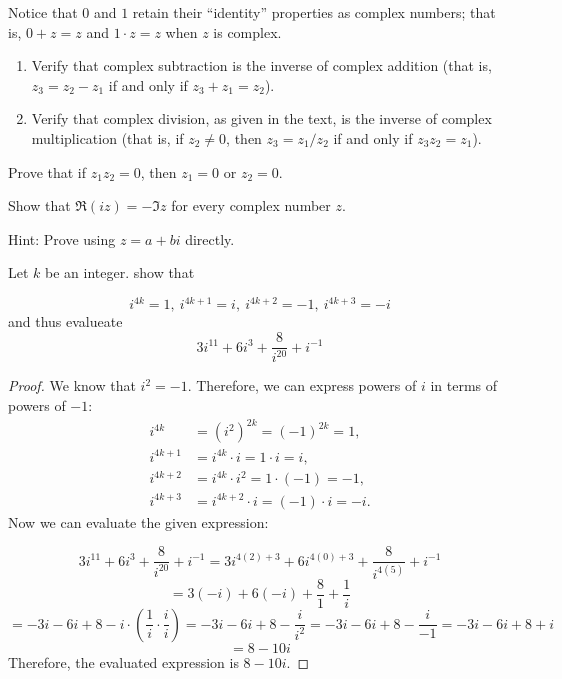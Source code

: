 \documentclass[
	12pt, %
	fleqn, %
	a4paper, %
]{LegrandOrangeBook}
\begin{document}
\begin{exercise}
    Notice that \(0\) and \(1\) retain their “identity” properties as complex numbers; that is, \(0 + z = z\) and \(1 \cdot z = z\) when \(z\) is complex.
    \begin{enumerate}[label=(\alph*)]
        \item Verify that complex subtraction is the inverse of complex addition (that is, \(z_3 = z_2 - z_1\) if and only if \(z_3 + z_1 = z_2\)).
        \item Verify that complex division, as given in the text, is the inverse of complex multiplication (that is, if \(z_2 \neq 0\), then \(z_3 = z_1 / z_2\) if and only if \(z_3z_2 = z_1\)).
    \end{enumerate}
    \end{exercise}

\begin{exercise}
    Prove that if $z_1z_2=0$, then $z_1=0$ or $z_2=0$.
\end{exercise}

\begin{exercise}
    Show that \(\Re(i z) = -\Im z\) for every complex number \(z\).
\end{exercise}
Hint: Prove using $z=a+bi$ directly.

\begin{exercise}
    Let $\displaystyle k$ be an integer. show that

\begin{equation*}
i^{4k} =1,\ i^{4k+1} =i,\ i^{4k+2} =-1,\ i^{4k+3} =-i
\end{equation*}
and thus evalueate
\begin{equation*}
3i^{11} +6i^{3} +\frac{8}{i^{20}} +i^{-1}
\end{equation*}
\end{exercise}
\begin{proof}
    We know that \( i^2 = -1 \). Therefore, we can express powers of \( i \) in terms of powers of \( -1 \):
\begin{align*}
i^{4k} &= (i^2)^{2k} = (-1)^{2k} = 1, \\
i^{4k+1} &= i^{4k} \cdot i = 1 \cdot i = i, \\
i^{4k+2} &= i^{4k} \cdot i^2 = 1 \cdot (-1) = -1, \\
i^{4k+3} &= i^{4k+2} \cdot i = (-1) \cdot i = -i.
\end{align*}
Now we can evaluate the given expression:

\[
3i^{11} + 6i^3 + \frac{8}{i^{20}} + i^{-1} = 3i^{4(2)+3} + 6i^{4(0)+3} + \frac{8}{i^{4(5)}} + i^{-1}
\]
\[
= 3(-i) + 6(-i) + \frac{8}{1} + \frac{1}{i}
\]
\[
= -3i - 6i + 8 - i \cdot \left( \frac{1}{i} \cdot \frac{i}{i} \right) = -3i - 6i + 8 - \frac{i}{i^2} = -3i - 6i + 8 - \frac{i}{-1} = -3i - 6i + 8 + i
\]
\[
= 8 - 10i
\]
Therefore, the evaluated expression is \( 8 - 10i \).
\end{proof}
\end{document}
